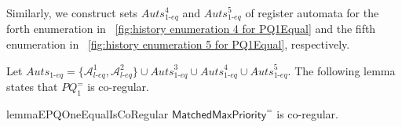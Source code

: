 Similarly, we construct sets $\textit{Auts}_{\textit{1-eq}}^{4}$ and $\textit{Auts}_{\textit{1-eq}}^{5}$ of register automata for the forth enumeration in \figurename~\ref{fig:history enumeration 4 for PQ1Equal} and the fifth enumeration in \figurename~\ref{fig:history enumeration 5 for PQ1Equal}, respectively.

Let $\textit{Auts}_{\textit{1-eq}} = \{ \mathcal{A}_{\textit{l-eq}}^1, \mathcal{A}_{\textit{l-eq}}^2 \} \cup \textit{Auts}_{\textit{1-eq}}^{3} \cup \textit{Auts}_{\textit{1-eq}}^{4} \cup \textit{Auts}_{\textit{1-eq}}^{5}$. The following lemma states that $\textit{PQ}_1^{=}$ is co-regular.


\begin{restatable}{lemma}{EPQOneEqualIsCoRegular}
\label{lemma:EPQ1Equal is co-regular}
$\mathsf{MatchedMaxPriority}^{=}$ is co-regular.
\end{restatable}

